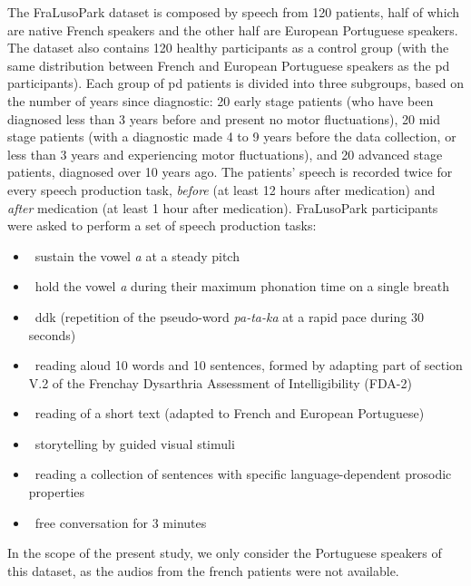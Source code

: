 The FraLusoPark dataset is composed by speech from 120 patients, half of which are native French speakers and the other half are European Portuguese speakers. The dataset also contains 120 healthy participants as a control group (with the same distribution between French and European Portuguese speakers as the \gls{pd} participants). Each group of \gls{pd} patients is divided into three subgroups, based on the number of years since diagnostic: 20 early stage patients (who have been diagnosed less than 3 years before and present no motor fluctuations), 20 mid stage patients (with a diagnostic made 4 to 9 years  before the data collection, or less than 3 years and experiencing motor fluctuations), and 20 advanced stage patients, diagnosed over 10 years ago. The patients' speech is recorded twice for every speech production task, \textit{before} (at least 12 hours after medication) and \textit{after} medication (at least 1 hour after medication). FraLusoPark participants were asked to perform a set of speech production tasks:

\begin{itemize}
	\item ~sustain the vowel \textit{\/a\/} at a steady pitch
	\item ~hold the vowel \textit{\/a\/} during their maximum phonation time on a single breath
	\item ~\gls{ddk} (repetition of the pseudo-word \textit{\/pa-ta-ka\/} at a rapid pace during 30 seconds)
	\item ~reading aloud 10 words and 10 sentences, formed by adapting part of section V.2 of the Frenchay Dysarthria Assessment of Intelligibility (FDA-2)
	\item ~reading of a short text (adapted to French and European Portuguese)
	\item ~storytelling by guided visual stimuli
	\item ~reading a collection of sentences with specific language-dependent prosodic properties
	\item ~free conversation for 3 minutes
	
\end{itemize}

In the scope of the present study, we only consider the Portuguese speakers of this dataset, as the audios from the french patients were not available.

